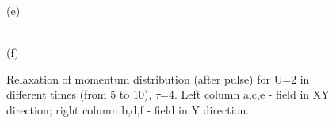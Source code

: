 \begin{figure}[h!]
\begin{minipage}[h]{0.43\linewidth}
\end{minipage}
\begin{minipage}[h]{0.43\linewidth}
 (e) \\
\end{minipage}
\hfill
\begin{minipage}[h]{0.43\linewidth}
 \\(f)
\end{minipage}
\caption{Relaxation of momentum distribution (after pulse) for U=2 in different times (from 5 to 10), $\tau$=4. Left column a,c,e - field in XY direction; right column b,d,f - field in Y direction.}
\label{fig:md_u2_08A_relaxation}
\end{figure}

